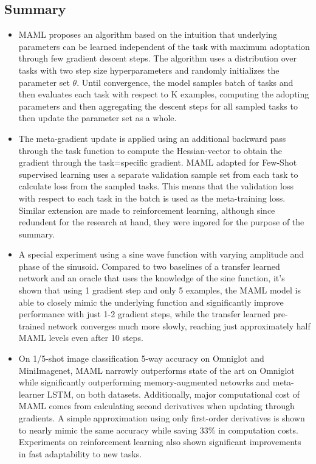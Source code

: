 \documentclass{article}
\begin{document}
\subsection{Summary}
\begin{itemize}
    \item MAML proposes an algorithm based on the intuition that underlying parameters can be learned independent of the task with maximum adoptation through few gradient descent steps. The algorithm uses a distribution over tasks with two step size hyperparameters and randomly initializes the parameter set $\theta$. Until convergence, the model samples batch of tasks and then evaluates each task with respect to K examples, computing the adopting parameters and then aggregating the descent steps for all sampled tasks to then update the parameter set as a whole.
    \item The meta-gradient update is applied using an additional backward pass through the task function to compute the Hessian-vector to obtain the gradient through the task=specific gradient. MAML adapted for Few-Shot supervised learning uses a separate validation sample set from each task to calculate loss from the sampled tasks. This means that the validation loss with respect to each task in the batch is used as the meta-training loss. Similar extension are made to reinforcement learning, although since redundent for the research at hand, they were ingored for the purpose of the summary.
    \item A special experiment using a sine wave function with varying amplitude and phase of the sinusoid. Compared to two baselines of a transfer learned network and an oracle that uses the knowledge of the sine function, it's shown that using 1 gradient step and only 5 examples, the MAML model is able to closely mimic the underlying function and significantly improve performance with just 1-2 gradient steps, while the transfer learned pre-trained network converges much more slowly, reaching just approximately half MAML levels even after 10 steps.
    \item On 1/5-shot image classification 5-way accuracy on Omniglot and MiniImagenet, MAML narrowly outperforms state of the art on Omniglot while significantly outperforming memory-augmented netowrks and meta-learner LSTM, on both datasets. Additionally, major computational cost of MAML comes from calculating second derivatives when updating through gradients. A simple approximation using only first-order derivatives is shown to nearly mimic the same accuracy while saving 33\% in computation costs. Experiments on reinforcement learning also shown significant improvements in fast adaptability to new tasks.
\end{itemize}
\end{document}
